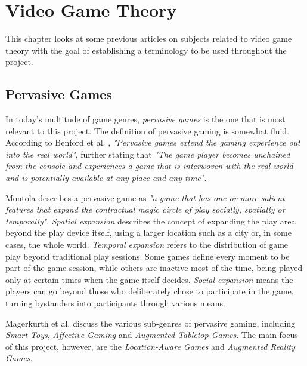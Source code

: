 
\chapter{Video Game Theory}
\label{chapter:lit-study-game-theory}

This chapter looks at some previous articles on subjects related to video game theory with the goal of establishing a terminology to be used throughout the project.

\section{Pervasive Games}

In today's multitude of game genres, \emph{pervasive games} is the one that is most relevant to this project. The definition of pervasive gaming is somewhat fluid. According to Benford et al. \cite{benford2005pervasive}, \emph{"Pervasive games extend the gaming experience out into the real world"}, further stating that \emph{"The game player becomes unchained from the console and experiences a game that is interwoven with the real world and is potentially available at any place and any time"}.

Montola \cite{montola2005exploring} describes a pervasive game as \emph{"a game that has one or more salient	features that expand the contractual magic circle of play socially, spatially or temporally"}. \emph{Spatial expansion} describes the concept of expanding the play area beyond the play device itself, using a larger location such as a city or, in some cases, the whole world. \emph{Temporal expansion} refers to the distribution of game play beyond traditional play sessions. Some games define every moment to be part of the game session, while others are inactive most of the time, being played only at certain times when the game itself decides. \emph{Social expansion} means the players can go beyond those who deliberately chose to participate in the game, turning bystanders into participants through various means.

Magerkurth et al. \cite{magerkurth2005pervasive} discuss the various sub-genres of pervasive gaming, including \emph{Smart Toys}, \emph{Affective Gaming} and \emph{Augmented Tabletop Games}. The main focus of this project, however, are the \emph{Location-Aware Games} and \emph{Augmented Reality Games}.

